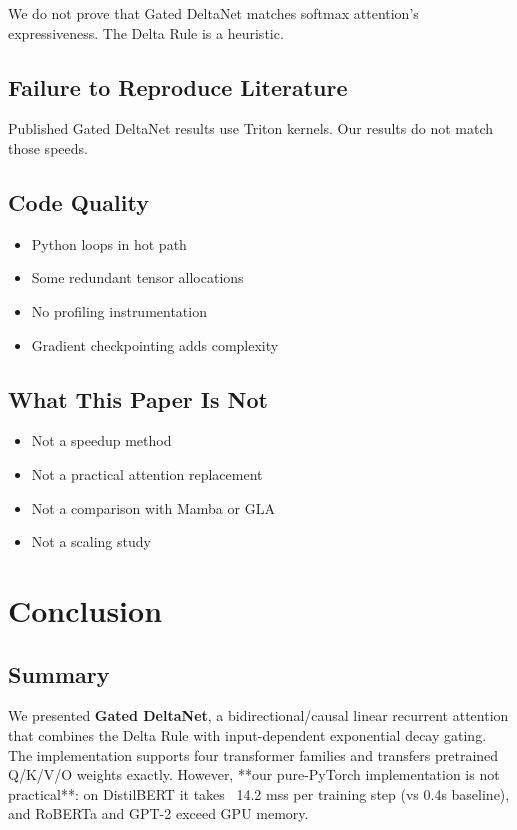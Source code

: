 We do not prove that Gated DeltaNet matches softmax attention's 
expressiveness. The Delta Rule is a heuristic.

\subsection{Failure to Reproduce Literature}

Published Gated DeltaNet results use Triton kernels. Our results do not 
match those speeds.

\subsection{Code Quality}

\begin{itemize}
\item Python loops in hot path
\item Some redundant tensor allocations
\item No profiling instrumentation
\item Gradient checkpointing adds complexity

\end{itemize}
\subsection{What This Paper Is Not}

\begin{itemize}
\item Not a speedup method
\item Not a practical attention replacement
\item Not a comparison with Mamba or GLA
\item Not a scaling study

\end{itemize}



\section{Conclusion}

\subsection{Summary}

We presented \textbf{Gated DeltaNet}, a bidirectional/causal linear recurrent 
attention that combines the Delta Rule with input-dependent exponential 
decay gating. The implementation supports four transformer families and 
transfers pretrained Q/K/V/O weights exactly. However, **our pure-PyTorch 
implementation is not practical**: on DistilBERT it takes ~14.2 mss 
per training step (vs 0.4s baseline), and RoBERTa and GPT-2 exceed GPU memory.

